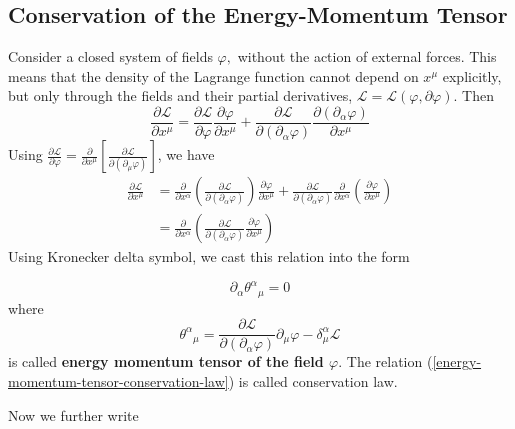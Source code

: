 \subsection{Conservation of the Energy-Momentum Tensor}
Consider a closed system of fields $\varphi,$ without the action of external forces. This means that the density of the Lagrange function cannot depend on $x^{\mu}$ explicitly, but only through the fields and their partial derivatives, $\mathcal{L}=\mathcal{L}(\varphi, \partial \varphi) .$ Then
\begin{equation}
\frac{\partial \mathcal{L}}{\partial x^{\mu}}=\frac{\partial \mathcal{L}}{\partial \varphi} \frac{\partial \varphi}{\partial x^{\mu}}+\frac{\partial \mathcal{L}}{\partial\left(\partial_{\alpha} \varphi\right)} \frac{\partial\left(\partial_{\alpha} \varphi\right)}{\partial x^{\mu}}
\end{equation}
Using $\frac{\partial \mathcal{L}}{\partial \varphi}=\frac{\partial}{\partial x^{\mu}}\left[\frac{\partial \mathcal{L}}{\partial\left(\partial_{\mu} \varphi\right)}\right]$, we have 
$$
\begin{aligned}
\frac{\partial \mathcal{L}}{\partial x^{\mu}} &=\frac{\partial}{\partial x^{\alpha}}\left(\frac{\partial \mathcal{L}}{\partial\left(\partial_{\alpha} \varphi\right)}\right) \frac{\partial \varphi}{\partial x^{\mu}}+\frac{\partial \mathcal{L}}{\partial\left(\partial_{\alpha} \varphi\right)} \frac{\partial}{\partial x^{\alpha}}\left(\frac{\partial \varphi}{\partial x^{\mu}}\right) \\
&=\frac{\partial}{\partial x^{\alpha}}\left(\frac{\partial \mathcal{L}}{\partial\left(\partial_{\alpha} \varphi\right)} \frac{\partial \varphi}{\partial x^{\mu}}\right)
\end{aligned}
$$
Using Kronecker delta symbol, we cast this relation into the form
\begin{qt}
\begin{equation}
\partial_{\alpha} \theta^{\alpha}{}_{\mu}=0
\label{energy-momentum-tensor-conservation-law}
\end{equation}
where
\begin{equation}
\theta^{\alpha}{}_{\mu}=\frac{\partial \mathcal{L}}{\partial\left(\partial_{\alpha} \varphi\right)} \partial_{\mu} \varphi-\delta_{\mu}^{\alpha} \mathcal{L}
\end{equation}
is called \textbf{energy momentum tensor of the field $\varphi$}. The relation (\ref{energy-momentum-tensor-conservation-law}) is called conservation law.
\end{qt}
Now we further write
